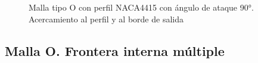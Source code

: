 \documentclass[letterpaper, openright, 12pt]{book}
\begin{document}
    \begin{figure}[htbp!]
        \centering
        \caption[Malla tipo O con perfil NACA4415 a 90\si{\degree}]{Malla tipo O con perfil NACA4415
                        con ángulo de ataque 90\si{\degree}. Acercamiento al perfil y al borde de salida}
        \label{fig:naca4415_-90}
    \end{figure}

    \subsection{Malla O. Frontera interna múltiple}
\end{document}
